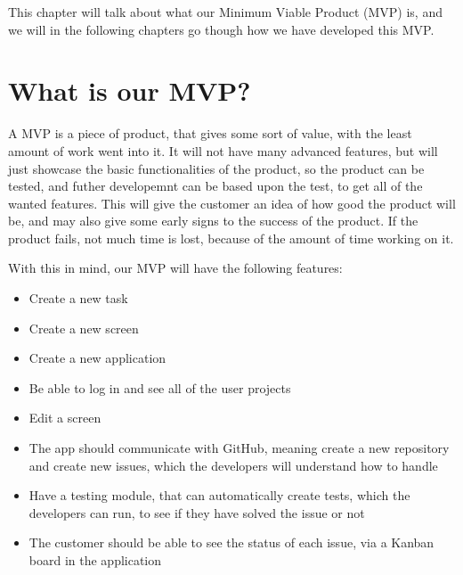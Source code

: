 This chapter will talk about what our Minimum Viable Product (MVP) is, and we will in the following chapters go though how we have developed this MVP.

\section{What is our MVP?}
A MVP is a piece of product, that gives some sort of value, with the least amount of work went into it.
It will not have many advanced features, but will just showcase the basic functionalities of the product, so the product can be tested, and futher developemnt can be based upon the test, to get all of the wanted features.
This will give the customer an idea of how good the product will be, and may also give some early signs to the success of the product. 
If the product fails, not much time is lost, because of the amount of time working on it. \cite{whatIsMVP}

With this in mind, our MVP will have the following features:

\begin{itemize}
    \item Create a new task
    \item Create a new screen
    \item Create a new application
    \item Be able to log in and see all of the user projects
    \item Edit a screen 
    \item The app should communicate with GitHub, meaning create a new repository and create new issues, which the developers will understand how to handle
    \item Have a testing module, that can automatically create tests, which the developers can run, to see if they have solved the issue or not
    \item The customer should be able to see the status of each issue, via a Kanban board in the application
\end{itemize}
